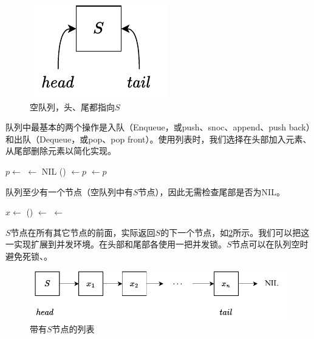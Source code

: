 \documentclass[b5paper]{ctexart}
\begin{document}
\begin{figure}[htbp]
  \centering
  \includegraphics[scale=0.6]{img/empty-list}
  \caption{空队列，头、尾都指向$S$}
  \label{fig:empty-list}
\end{figure}

队列中最基本的两个操作是入队（Enqueue，或push、snoc、append、push back）和出队（Dequeue，或pop、pop front）。使用列表时，我们选择在头部加入元素、从尾部删除元素以简化实现。

\begin{algorithmic}[1]
  \State $p \gets $ 
  \State {} $\gets$ NIL
  \State {}() $\gets p$
  \State {} $\gets p$
\EndFunction
\end{algorithmic}

队列至少有一个节点（空队列中有$S$节点），因此无需检查尾部是否为NIL。

\begin{algorithmic}[1]
  \State $x \gets $ 
  \State {}() $\gets$ 
   
    \State {} $\gets$ 
  \EndIf
  \State \Return {}
\EndFunction
\end{algorithmic}

$S$节点在所有其它节点的前面，实际返回$S$的下一个节点，如\cref{fig:list-queue}所示。我们可以把这一实现扩展到并发环境。在头部和尾部各使用一把并发锁。$S$节点可以在队列空时避免死锁\cite{PODC96}、\cite{SutterDDJ}。

\begin{figure}[htbp]
  \centering
  \includegraphics[scale=0.8]{img/slistq}
  \caption{带有$S$节点的列表}
  \label{fig:list-queue}
\end{figure}
\end{document}
